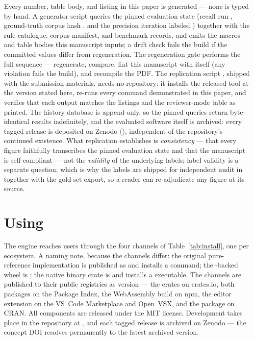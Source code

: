 \documentclass[nojss,article]{jss}
\begin{document}
Every number, table body, and listing in this paper is generated ---
none is typed by hand. A generator script queries the pinned
evaluation state (recall run \StatPinnedRecallRun{}, ground-truth
corpus hash \code{\StatPinnedRecallHash}, and the precision iteration
labeled \code{\StatPinnedIteration}) together with the rule
catalogue, corpus manifest, and benchmark records, and emits the
macros and table bodies this manuscript inputs; a drift check fails
the build if the committed values differ from regeneration. The
regeneration gate  performs the full sequence ---
regenerate, compare, lint this manuscript with  itself
(any violation fails the build), and recompile the PDF. The
replication script , shipped with the submission
materials, needs no repository: it installs the released tool at the
version stated here, re-runs every command demonstrated in this
paper, and verifies that each output matches the listings and the
reviewer-mode table as printed. The history
database is append-only, so the pinned queries return byte-identical
results indefinitely, and the evaluated software itself is archived:
every tagged release is deposited on Zenodo
(\StatSoftwareDoiUrl{}), independent of the repository's continued
existence. What replication establishes is
\emph{consistency} --- that every figure faithfully transcribes the
pinned evaluation state and that the manuscript is self-compliant ---
not the \emph{validity} of the underlying labels; label validity is a
separate question, which is why the labels are shipped for independent
audit in  together with the gold-set
export, so a reader can re-adjudicate any figure at its source.

\section[Using jss-lint]{Using }
\label{sec:usage}

The engine reaches users through the four channels of
Table~\ref{tab:install}, one per ecosystem. A naming note, because the
channels differ: the original pure- reference
implementation is published as \pkg{\StatPyPIName} and installs a
 command; the -backed wheel is
; the native binary crate is  and
installs a  executable. The channels are published to
their public registries as version \StatToolVersion{} --- the crates
on crates.io, both  packages on the Package Index,
the WebAssembly build on npm, the editor extension on the VS~Code
Marketplace and Open~VSX, and the  package
 on CRAN. All components are released under the MIT
license.
Development takes place in the repository at \StatRepoUrl{}, and each
tagged release is archived on Zenodo --- the concept DOI
\code{\StatSoftwareDoi} resolves permanently to the latest archived
version.
\end{document}
